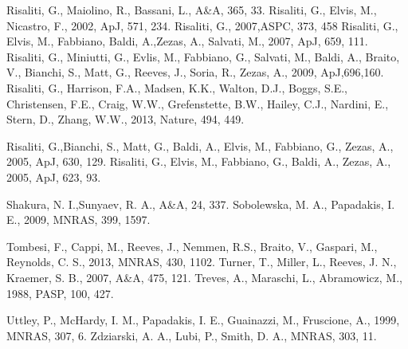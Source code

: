 \documentclass[useAMS,usenatbib]{sam}
\begin{document}
\begin{thebibliography}{99}
     Risaliti, G., Maiolino, R., Bassani, L., A\&A, 365, 33.
     Risaliti, G., Elvis, M., Nicastro, F., 2002, ApJ, 571, 234.
     Risaliti, G., 2007,ASPC, 373, 458
     Risaliti, G., Elvis, M., Fabbiano, Baldi, A.,Zezas, A., Salvati, M., 2007, ApJ, 659, 111.
     Risaliti, G., Miniutti, G., Evlis, M., Fabbiano, G., Salvati, M., Baldi, A., Braito, V., 
									 Bianchi, S., Matt, G., Reeves, J., Soria, R., Zezas, A., 2009, ApJ,696,160.     
     Risaliti, G., Harrison, F.A., Madsen, K.K., Walton, D.J., Boggs, S.E., Christensen,  F.E., 
							Craig, W.W., Grefenstette, B.W., Hailey, C.J., Nardini, E., Stern, D., Zhang, W.W., 2013, Nature, 494, 449. 

     Risaliti, G.,Bianchi, S., Matt, G., Baldi, A., Elvis, M., Fabbiano, G., Zezas, A., 2005, ApJ,
630, 129.
     Risaliti, G., Elvis, M., Fabbiano, G., Baldi, A., Zezas, A., 2005, ApJ, 623, 93.
    
     Shakura, N. I.,Sunyaev, R. A., A\&A, 24, 337.
     Sobolewska, M. A., Papadakis, I. E., 2009, MNRAS, 399, 1597.

     Tombesi, F., Cappi, M., Reeves, J., Nemmen, R.S., Braito, V., Gaspari, M., Reynolds, C. S., 2013,
MNRAS, 430, 1102.
     Turner, T., Miller, L., Reeves, J. N., Kraemer, S. B., 2007, A\&A, 475, 121.
     Treves, A., Maraschi, L., Abramowicz, M., 1988, PASP, 100, 427.
    
     Uttley, P., McHardy, I. M., Papadakis, I. E., Guainazzi, M., Fruscione, A., 1999, MNRAS, 307, 6.
     Zdziarski, A. A., Lubi, P., Smith, D. A., MNRAS, 303, 11.
    
\end{thebibliography}


\label{lastpage}
\end{document}
